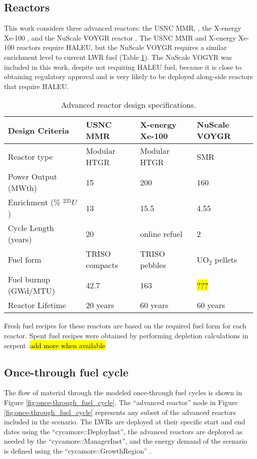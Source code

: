 \subsection{Reactors} \label{sec:reactor_methods}
This work considers three advanced reactors: the \gls{USNC} \gls{MMR}, 
\cite{mitchell_usnc_2020}, the X-energy Xe-100 
\cite{harlan_x-energy_2018,hussain_advances_2018}, and the NuScale VOYGR reactor
\cite{nuscale_chapter_2020,nuscale_chapter_2020-1}. The \gls{USNC} \gls{MMR}
and X-energy Xe-100 reactors require \gls{HALEU}, but the NuScale VOYGR requires
a similar enrichment level to current \gls{LWR} fuel (Table \ref{tab:reactor_summary}). 
The NuScale VOGYR was included in this work, despite not requiring \gls{HALEU} fuel, 
because it is close to obtaining regulatory approval and is very likely to be 
deployed along-side reactors that require \gls{HALEU}. 

\begin{table}[ht]
    \centering
    \caption{Advanced reactor design specifications. }
    \label{tab:reactor_summary}
    \begin{tabular}{p{5cm}p{3cm}p{3cm}p{3cm}}
        \hline
        Design Criteria & \gls{USNC} \gls{MMR} & 
            X-energy Xe-100 & NuScale VOYGR \\\hline
        Reactor type & Modular HTGR & Modular HTGR & SMR\\
        Power Output (MWth) & 15 & 200 & 160\\
        Enrichment (\% $^{235}U$) & 13 & 15.5 & 4.55\\
        Cycle Length (years) & 20 & online refuel & 2\\
        Fuel form & \gls{TRISO} compacts & \gls{TRISO} pebbles & UO$_2$ pellets\\
        Fuel burnup (GWd/MTU) & 42.7& 163& \hl{???}\\
        Reactor Lifetime & 20 years & 60 years & 60 years\\
        \hline
    \end{tabular}
\end{table}

Fresh fuel recipes for these reactors are based on the required fuel form for 
each reactor. Spent fuel recipes were obtained by performing depletion 
calculations in serpent \cite{leppanen_serpent_2014}.\hl{add more when available}

\subsection{Once-through fuel cycle}
The flow of material through the modeled once-through fuel cycles is shown 
in Figure \ref{fig:once-through_fuel_cycle}. The ``advanced reactor'' node in Figure 
\ref{fig:once-through_fuel_cycle} represents any subset of the advanced reactors included 
in the scenario. The \glspl{LWR} are deployed at their specific start and end dates 
using the ``cycamore::DeployInst'', the advanced reactors are deployed as needed by 
the ``cycamore::ManagerInst'', and the energy demand of the scenario is defined using 
the ``cycamore::GrowthRegion'' \cite{scopatz_cyclus_2015}.

